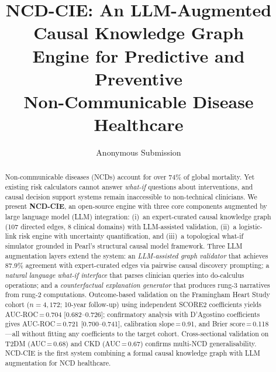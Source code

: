 \documentclass[runningheads]{llncs}
\begin{document}
\title{NCD-CIE: An LLM-Augmented Causal Knowledge Graph\\Engine for Predictive and Preventive\\Non-Communicable Disease Healthcare}

\author{Anonymous Submission}

\maketitle

\begin{abstract}
Non-communicable diseases (NCDs) account for over 74\% of global
mortality.
Yet existing risk calculators cannot answer \emph{what-if} questions
about interventions, and causal decision support systems remain
inaccessible to non-technical clinicians.
We present \textbf{NCD-CIE}, an open-source engine with three
core components augmented by large language model (LLM) integration:
(i)~an expert-curated causal knowledge graph (107 directed edges,
8 clinical domains) with LLM-assisted validation,
(ii)~a logistic-link risk engine with uncertainty quantification, and
(iii)~a topological what-if simulator grounded in Pearl's structural
causal model framework.
Three LLM augmentation layers extend the system:
an \emph{LLM-assisted graph validator} that achieves 87.9\% agreement
with expert-curated edges via pairwise causal discovery prompting;
a \emph{natural language what-if interface} that parses clinician
queries into do-calculus operations; and
a \emph{counterfactual explanation generator} that produces
rung-3 narratives from rung-2 computations.
Outcome-based validation on the Framingham Heart Study cohort
($n\!=\!4{,}172$; 10-year follow-up) using independent SCORE2
coefficients yields AUC-ROC\,=\,0.704 [0.682--0.726]; confirmatory
analysis with D'Agostino coefficients gives
AUC-ROC\,=\,0.721 [0.700--0.741],
calibration slope\,=\,0.91, and Brier score\,=\,0.118---all
without fitting any coefficients to the target cohort.
Cross-sectional validation on T2DM (AUC\,=\,0.68) and CKD
(AUC\,=\,0.67) confirms multi-NCD generalisability.
NCD-CIE is the first system combining a formal causal knowledge
graph with LLM augmentation for NCD healthcare.

\end{abstract}
\end{document}
